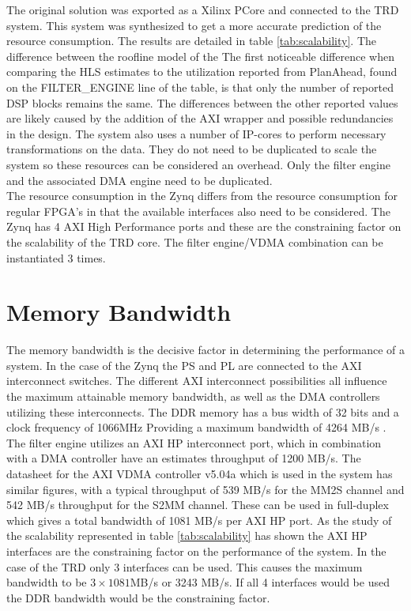 

The original solution was exported as a Xilinx PCore and connected to the TRD system. This system was synthesized to get a more accurate prediction of the resource consumption. The results are detailed in table \ref{tab:scalability}. The difference between the roofline model of the The first noticeable difference when comparing the HLS estimates to the utilization reported from PlanAhead, found on the FILTER\_ENGINE line of the table, is that only the number of reported DSP blocks remains the same. The differences between the other reported values are likely caused by the addition of the AXI wrapper and possible redundancies in the design. The system also uses a number of IP-cores to perform necessary transformations on the data. They do not need to be duplicated to scale the system so these resources can be considered an overhead. Only the filter engine and the associated DMA engine need to be duplicated.\\
The resource consumption in the Zynq differs from the resource consumption for regular FPGA's in that the available interfaces also need to be considered. The Zynq has 4 AXI High Performance ports and these are the constraining factor on the scalability of the TRD core. The filter engine/VDMA combination can be instantiated 3 times. 



\section{Memory Bandwidth}

The memory bandwidth is the decisive factor in determining the performance of a system. In the case of the Zynq the PS and PL are connected to the AXI interconnect switches. The different AXI interconnect possibilities all influence the maximum attainable memory bandwidth, as well as the DMA controllers utilizing these interconnects. The DDR memory has a bus width of 32 bits and a clock frequency of 1066MHz Providing a maximum bandwidth of 4264 MB/s \cite{anon._zynq-7000_2013}. The filter engine utilizes an AXI HP interconnect port, which in combination with a DMA controller have an estimates throughput of 1200 MB/s. The datasheet for the AXI VDMA controller v5.04a which is used in the system has similar figures, with a typical throughput of 539 MB/s for the MM2S channel and 542 MB/s throughput for the S2MM channel. These can be used in full-duplex which gives a total bandwidth of 1081 MB/s per AXI HP port\cite{axivdma}.
As the study of the scalability represented in table \ref{tab:scalability} has shown the AXI HP interfaces are the constraining factor on the performance of the system. In the case of the TRD only 3 interfaces can be used. This causes the maximum bandwidth to be $3 \times 1081$MB/s or 3243 MB/s. If all 4 interfaces would be used the DDR bandwidth would be the constraining factor.

